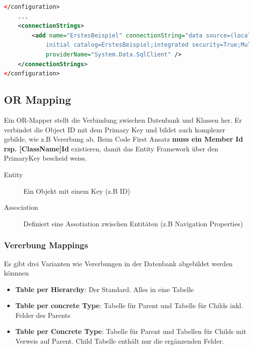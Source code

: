 \begin{lstlisting}[language=XML, caption=app.config]
</configuration>
	...
	<connectionStrings>
		<add name="ErstesBeispiel" connectionString="data source=(localdb)\mssqllocaldb;
			initial catalog=ErstesBeispiel;integrated security=True;MultipleActiveResultSets=True;App=EntityFramework"
			providerName="System.Data.SqlClient" />
	</connectionStrings>
</configuration>
\end{lstlisting}

\subsection{OR Mapping}
Ein OR-Mapper stellt die Verbindung zwischen Datenbank und Klassen her. Er verbindet die Object ID mit dem Primary Key und bildet auch komplexer gebilde, wie z.B Vererbung ab. Beim Code First Ansatz \textbf{muss ein Member Id rsp. [ClassName]Id} existieren, damit das Entity Framework über den PrimaryKey bescheid weiss.
\begin{description}
	\item[Entity] Ein Objekt mit einem Key (z.B ID)
	\item[Association] Definiert eine Assotiation zwischen Entitäten (z.B Navigation Properties)
\end{description}

\subsubsection{Vererbung Mappings}
Es gibt drei Varianten wie Vererbungen in der Datenbank abgebildet werden könnnen
\begin{itemize}
	\item \textbf{Table per Hierarchy}: Der Standard. Alles in eine Tabelle
	\item \textbf{Table per concrete Type}: Tabelle für Parent und Tabelle für Childs inkl. Felder des Parents
	\item \textbf{Table per Concrete Type}: Tabelle für Parent und Tabellen für Childs mit Verweis auf Parent. Child Tabelle enthält nur die ergänzenden Felder.
\end{itemize}

